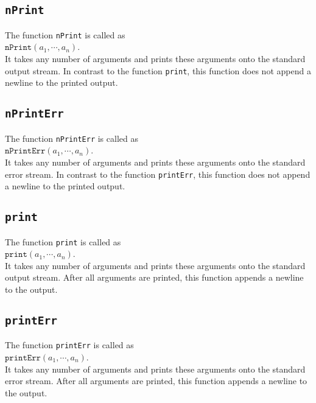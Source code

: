 \subsection{\texttt{nPrint}}
The function \texttt{nPrint}  is called as
\\[0.2cm]
\hspace*{1.3cm}
$\mathtt{nPrint}(a_1, \cdots, a_n)$.
\\[0.2cm]
It takes any number of arguments and prints these arguments onto the standard output
stream.  In contrast to the function
\texttt{print}, this function does not append a newline to the printed output.

\subsection{\texttt{nPrintErr}}
The function \texttt{nPrintErr}  is called as
\\[0.2cm]
\hspace*{1.3cm}
$\mathtt{nPrintErr}(a_1, \cdots, a_n)$.
\\[0.2cm]
It takes any number of arguments and prints these arguments onto the standard error
stream.  In contrast to the function
\texttt{printErr}, this function does not append a newline to the printed output.

\subsection{\texttt{print}}
The function \texttt{print}  is called as
\\[0.2cm]
\hspace*{1.3cm}
$\mathtt{print}(a_1, \cdots, a_n)$.
\\[0.2cm]
It takes any number of arguments and prints these arguments onto the standard output
stream. After all arguments are
printed, this function appends a newline to the output.

\subsection{\texttt{printErr}}
The function \texttt{printErr}  is called as
\\[0.2cm]
\hspace*{1.3cm}
$\mathtt{printErr}(a_1, \cdots, a_n)$.
\\[0.2cm]
It takes any number of arguments and prints these arguments onto the standard error
stream.  After all arguments are
printed, this function appends a newline to the output.

